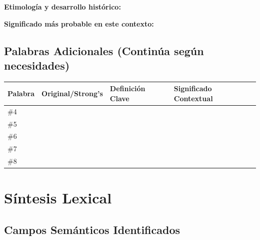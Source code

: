 \documentclass[11pt,a4paper]{article}
\begin{document}
\vspace{0.5cm}

\textbf{Etimología y desarrollo histórico:}
\vspace{2cm}

\textbf{Significado más probable en este contexto:}
\vspace{2cm}

\newpage

\subsection{Palabras Adicionales (Continúa según necesidades)}

\begin{tabularx}{\textwidth}{|C{1.5cm}|L{3.5cm}|L{4cm}|X|}
\hline
\textbf{Palabra} & \textbf{Original/Strong's} & \textbf{Definición Clave} & \textbf{Significado Contextual} \\
\hline
\#4 & \vspace{1.5cm} & \vspace{1.5cm} & \vspace{1.5cm} \\
\hline
\#5 & \vspace{1.5cm} & \vspace{1.5cm} & \vspace{1.5cm} \\
\hline
\#6 & \vspace{1.5cm} & \vspace{1.5cm} & \vspace{1.5cm} \\
\hline
\#7 & \vspace{1.5cm} & \vspace{1.5cm} & \vspace{1.5cm} \\
\hline
\#8 & \vspace{1.5cm} & \vspace{1.5cm} & \vspace{1.5cm} \\
\hline
\end{tabularx}

\section{Síntesis Lexical}

\subsection{Campos Semánticos Identificados}
\end{document}
